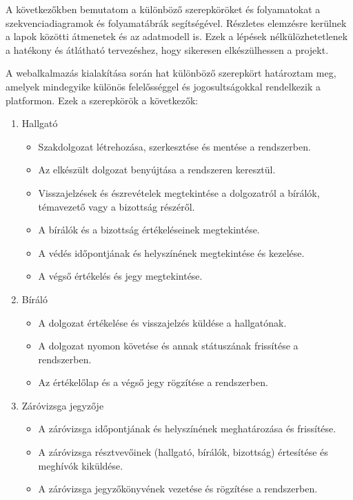 
A következőkben bemutatom a különböző szerepköröket és folyamatokat a szekvenciadiagramok és folyamatábrák segítségével. Részletes elemzésre kerülnek a lapok közötti átmenetek és az adatmodell is. Ezek a lépések nélkülözhetetlenek a hatékony és átlátható tervezéshez, hogy sikeresen elkészülhessen a projekt.


A webalkalmazás kialakítása során hat különböző szerepkört határoztam meg, amelyek mindegyike különös felelősséggel és jogosultságokkal rendelkezik a platformon. Ezek a szerepkörök a következők:

\begin{enumerate}
\item Hallgató
\begin{itemize}
\item Szakdolgozat létrehozása, szerkesztése és mentése a rendszerben.
\item Az elkészült dolgozat benyújtása a rendszeren keresztül.
\item Visszajelzések és észrevételek megtekintése a dolgozatról a bírálók, témavezető vagy a bizottság részéről.
\item A bírálók és a bizottság értékeléseinek megtekintése.
\item A védés időpontjának és helyszínének megtekintése és kezelése.
\item A végső értékelés és jegy megtekintése.
\end{itemize}

\item Bíráló
\begin{itemize}
\item A dolgozat értékelése és visszajelzés küldése a hallgatónak.
\item A dolgozat nyomon követése és annak státuszának frissítése a rendszerben.
\item Az értékelőlap és a végső jegy rögzítése a rendszerben.
\end{itemize}

\item Záróvizsga jegyzője
\begin{itemize}
\item A záróvizsga időpontjának és helyszínének meghatározása és frissítése.
\item A záróvizsga résztvevőinek (hallgató, bírálók, bizottság) értesítése és meghívók kiküldése.
\item A záróvizsga jegyzőkönyvének vezetése és rögzítése a rendszerben.
\end{itemize}


\end{enumerate}
